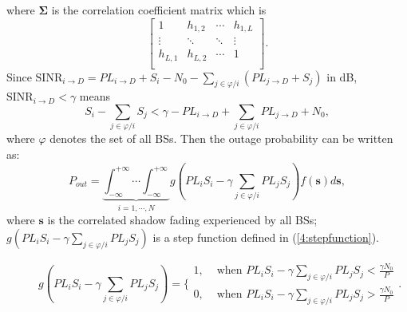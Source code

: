 \documentclass[journal,10pt]{IEEEtran}
\begin{document}
 where $\mathbf{\Sigma}$ is the correlation coefficient matrix which is
 \begin{equation}
 \left[\begin{array}{cccc}
 1 & h_{1,2} & \cdots & h_{1,L}\\
 \vdots & \ddots & \ddots & \vdots\\
 h_{L,1} & h_{L,2} & \cdots & 1\\
 \end{array}\right].
 \end{equation}
 Since $\text{SINR}_{i\to D}=PL_{i\to D}+S_{i}-N_{0}-\sum_{j\in\varphi/i}(PL_{j\to D} + S_{j})$ in dB, $\text{SINR}_{i\to D}<\gamma$ means
 \begin{equation}
 S_{i} - \sum_{j\in\varphi/i}S_{j}<\gamma -PL_{i\to D} + \sum_{j\in\varphi/i}PL_{j\to D} + N_{0},
 \end{equation}
 where $\varphi$ denotes the set of all BSs.
 Then the outage probability can be written as:
 \begin{equation}
 \label{4:outprob}
 P_{out} = \underbrace{\int_{-\infty}^{+\infty}\cdots\int_{-\infty}^{+\infty}}_{i =1,\cdots,N} g(PL_{i}S_{i} - \gamma\sum_{j\in\varphi/i}PL_{j}S_{j})f(\mathbf{s})d\mathbf{s},
 \end{equation}
 where $\mathbf{s}$ is the correlated shadow fading experienced by all BSs; $g(PL_{i}S_{i} - \gamma\sum_{j\in\varphi/i}PL_{j}S_{j})$ is a step function defined in (\ref{4:stepfunction}). 
  \begin{figure}[!t]
 \normalsize

 \begin{equation}
 \label{4:stepfunction}
 g(PL_{i}S_{i} - \gamma\sum_{j\in\varphi/i}PL_{j}S_{j}) = \{\begin{array}{cc}
                1, &  \text{  when }PL_{i}S_{i} - \gamma\sum_{j\in\varphi/i}PL_{j}S_{j} <\frac{\gamma N_{0}}{P}\\
                0, & \text{  when }PL_{i}S_{i} - \gamma\sum_{j\in\varphi/i}PL_{j}S_{j} >\frac{\gamma N_{0}}{P}
              \end{array}.
 \end{equation}
 \hrulefill
 \vspace*{4pt}
 \end{figure}
\end{document}
